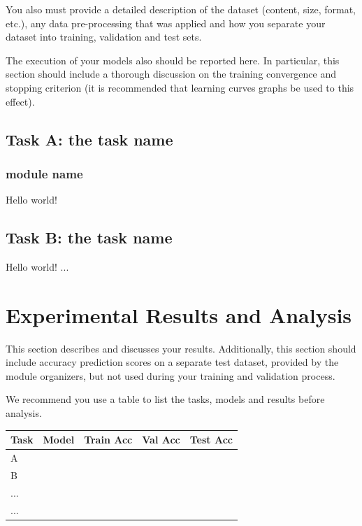 \documentclass{article}
\begin{document}
    You also must provide a detailed description of the dataset (content, size, format, etc.), any data pre-processing that was applied and how you separate your dataset into training, validation and test sets.
    
    The execution of your models also should be reported here. In particular, this section should include a thorough discussion on the training convergence and stopping criterion (it is recommended that learning curves graphs be used to this effect).

    \subsection{Task A: the task name}
    \label{ssec:imp_models_A1}
    \subsubsection{module name}
    Hello world!
    \subsection{Task B: the task name}
    \label{ssec:imp_models_B}
    Hello world! ...
    

\section{Experimental Results and Analysis}
\label{sec:results}
    This section describes and discusses your results. Additionally, this section should include accuracy prediction scores on a separate test dataset, provided by the module organizers, but not used during your training and validation process.
    
    We recommend you use a table to list the tasks, models and results before analysis.
    

    \begin{table}[]
    \label{table:Table1}
    \begin{tabular}{@{}lllll@{}}
    \toprule
    Task & Model & Train Acc & Val Acc & Test Acc \\ \midrule
    A   &       &           &         &          \\
    B   &       &           &         &          \\
    ...   &       &           &         &          \\
    ...   &       &           &         &          \\ \bottomrule
    \end{tabular}
    \end{table}
\end{document}
